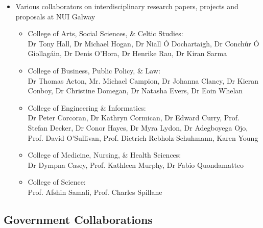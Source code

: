 \documentclass[10pt,a4paper]{res} %
\begin{document}
\begin{resume}
\begin{itemize}
\begin{itemize}
\end{itemize}
\item Various collaborators on interdisciplinary research papers, projects and proposals at NUI Galway
\begin{itemize} \itemsep -2pt
\item College of Arts, Social Sciences, \& Celtic Studies: \\ Dr Tony Hall, Dr Michael Hogan, Dr Niall \'{O} Dochartaigh, Dr Conch\'{u}r \'{O} Giollag\'{a}in, Dr Denis O'Hora, Dr Henrike Rau, Dr Kiran Sarma
\item College of Business, Public Policy, \& Law: \\ Dr Thomas Acton, Mr. Michael Campion, Dr Johanna Clancy, Dr Kieran Conboy, Dr Christine Domegan, Dr Natasha Evers, Dr Eoin Whelan
\item College of Engineering \& Informatics: \\ Dr Peter Corcoran, Dr Kathryn Cormican, Dr Edward Curry, Prof. Stefan Decker, Dr Conor Hayes, Dr Myra Lydon, Dr Adegboyega Ojo, Prof. David O'Sullivan, Prof. Dietrich Rebholz-Schuhmann, Karen Young
\item College of Medicine, Nursing, \& Health Sciences: \\ Dr Dympna Casey, Prof. Kathleen Murphy, Dr Fabio Quondamatteo
\item College of Science: \\ Prof. Afshin Samali, Prof. Charles Spillane
\end{itemize}
\end{itemize}

\subsection*{Government Collaborations}


\end{resume}
\end{document}
